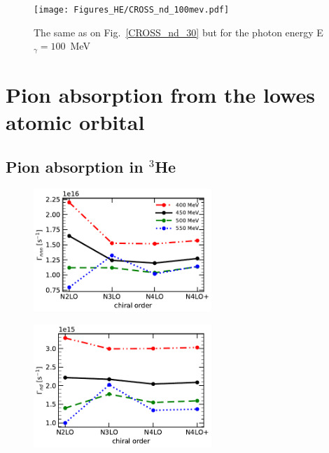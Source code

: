     \begin{figure}[h]
        \begin{center}
        \texttt{[image: Figures\_HE/CROSS\_nd\_100mev.pdf]}
        \end{center}
        \caption{The same as on Fig.~\ref{CROSS_nd_30} but 
        for the photon energy E$_\gamma=100$~MeV}
        \label{CROSS_nd_100}
    \end{figure}

    \clearpage
    \section{Pion absorption from the lowes atomic orbital}

    \subsection{Pion absorption in $^3$He}

    \begin{figure}[h]
        \begin{center}
        \includegraphics[width=0.6\textwidth]{PlotData/PION/Dalitz_maps/figures/Gamma_pnn.pdf}
        \end{center}
        \caption{}
        \label{Gamma_pnn}
    \end{figure}

    \begin{figure}[h]
        \begin{center}
        \includegraphics[width=0.6\textwidth]{PlotData/PION/Dalitz_maps/figures/Gamma_nd.pdf}
        \end{center}
        \caption{}
        \label{Gamma_nd}
    \end{figure}

